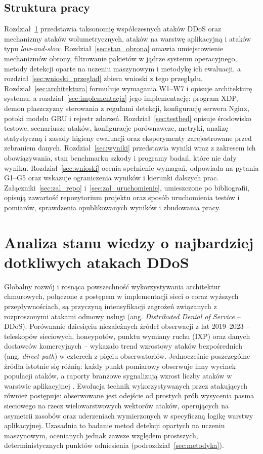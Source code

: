 \documentclass[a4paper,12pt]{article}
\begin{document}
\subsection{Struktura pracy}
Rozdział~\ref{sec:stan_ataki} przedstawia taksonomię współczesnych ataków DDoS oraz mechanizmy ataków wolumetrycznych, ataków na warstwę aplikacyjną i ataków typu \textit{low-and-slow}. Rozdział~\ref{sec:stan_obrona} omawia umiejscowienie mechanizmów obrony, filtrowanie pakietów w jądrze systemu operacyjnego, metody detekcji oparte na uczeniu maszynowym i metodykę ich ewaluacji, a rozdział~\ref{sec:wnioski_przeglad} zbiera wnioski z tego przeglądu. Rozdział~\ref{sec:architektura} formułuje wymagania W1--W7 i opisuje architekturę systemu, a rozdział~\ref{sec:implementacja} jego implementację: program XDP, demon płaszczyzny sterowania z regułami detekcji, konfigurację serwera Nginx, potoki modelu GRU i rejestr zdarzeń. Rozdział~\ref{sec:testbed} opisuje środowisko testowe, scenariusze ataków, konfiguracje porównawcze, metryki, analizę statystyczną i zasady higieny ewaluacji oraz eksperymenty zarejestrowane przed zebraniem danych. Rozdział~\ref{sec:wyniki} przedstawia wyniki wraz z zakresem ich obowiązywania, stan benchmarku szkody i programy badań, które nie dały wyniku. Rozdział~\ref{sec:wnioski} ocenia spełnienie wymagań, odpowiada na pytania G1--G5 oraz wskazuje ograniczenia wyników i kierunki dalszych prac. Załączniki~\ref{sec:zal_repo} i~\ref{sec:zal_uruchomienie}, umieszczone po bibliografii, opisują zawartość repozytorium projektu oraz sposób uruchomienia testów i pomiarów, sprawdzenia opublikowanych wyników i zbudowania pracy.

\section{Analiza stanu wiedzy o najbardziej dotkliwych atakach DDoS}\label{sec:stan_ataki}
Globalny rozwój i rosnąca powszechność wykorzystywania architektur chmurowych, połączone z postępem w implementacji sieci o coraz wyższych przepływnościach, są przyczyną intensyfikacji zagrożeń związanych z rozproszonymi atakami odmowy usługi (ang. \textit{Distributed Denial of Service} -- DDoS). Porównanie dziesięciu niezależnych źródeł obserwacji z lat 2019--2023 -- teleskopów sieciowych, honeypotów, punktu wymiany ruchu (IXP) oraz danych dostawców komercyjnych -- wykazało trend wzrostowy ataków bezpośrednich (ang. \textit{direct-path}) w czterech z pięciu obserwatoriów. Jednocześnie poszczególne źródła istotnie się różnią: każdy punkt pomiarowy obserwuje inny wycinek populacji ataków, a raporty branżowe sygnalizują wzrost liczby ataków w warstwie aplikacyjnej \cite{hiesgen2024age}. Ewolucja technik wykorzystywanych przez atakujących również postępuje: obserwowane jest odejście od prostych prób wysycenia pasma sieciowego na rzecz wielowarstwowych wektorów ataków, operujących na asymetrii zasobów oraz uderzeniach wymierzonych w specyficzną logikę warstwy aplikacyjnej. Uzasadnia to badanie metod detekcji opartych na uczeniu maszynowym, ocenianych jednak zawsze względem prostszych, deterministycznych punktów odniesienia (podrozdział~\ref{sec:metodyka}).
\end{document}
